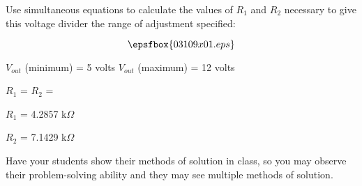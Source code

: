 

Use simultaneous equations to calculate the values of $R_1$ and $R_2$ necessary to give this voltage divider the range of adjustment specified:

$$\epsfbox{03109x01.eps}$$

$V_{out}$ (minimum) = 5 volts \hskip 30pt $V_{out}$ (maximum) = 12 volts

\vskip 20pt

$R_1$ = \hskip 80pt $R_2$ =

\vskip 10pt







$R_1$ = 4.2857 k$\Omega$

\vskip 10pt

$R_2$ = 7.1429 k$\Omega$







Have your students show their methods of solution in class, so you may observe their problem-solving ability and they may see multiple methods of solution.




